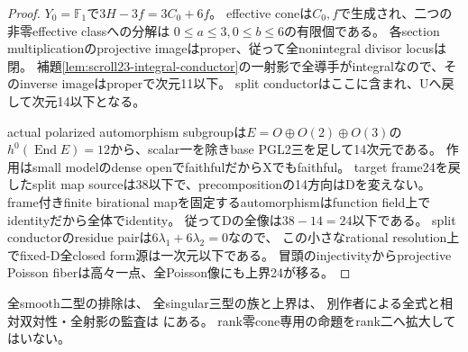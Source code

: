 \documentclass[a4paper,11pt]{ltjsarticle}
\theoremstyle{definition}
\begin{document}
\begin{proof}
$Y_0=\mathbb F_1$で$3H-3f=3C_0+6f$。
effective coneは$C_0,f$で生成され、二つの非零effective classへの分解は
$0\le a\le3,0\le b\le6$の有限個である。
各section multiplicationのprojective imageはproper、従って全nonintegral divisor locusは閉。
補題\ref{lem:scroll23-integral-conductor}の一射影で全導手がintegralなので、そのinverse imageはproperで次元11以下。
split conductorはここに含まれ、Uへ戻して次元14以下となる。

actual polarized automorphism subgroupは$E=O\oplus O(2)\oplus O(3)$の
$h^0(\operatorname{End}E)=12$から、scalar一を除きbase PGL2三を足して14次元である。
作用はsmall modelのdense openでfaithfulだからXでもfaithful。
target frame24を戻したsplit map sourceは38以下で、precompositionの14方向はDを変えない。
frame付きfinite birational mapを固定するautomorphismはfunction field上でidentityだから全体でidentity。
従ってDの全像は$38-14=24$以下である。
split conductorのresidue pairは$6\lambda_1+6\lambda_2=0$なので、
この小さなrational resolution上でfixed-D全closed form源は一次元以下である。
冒頭のinjectivityからprojective Poisson fiberは高々一点、全Poisson像にも上界24が移る。
\end{proof}
全smooth二型の排除は、
全singular三型の族と上界は、
別作者による全式と相対双対性・全射影の監査は
にある。
rank零cone専用の命題をrank二へ拡大してはいない。
\end{document}
